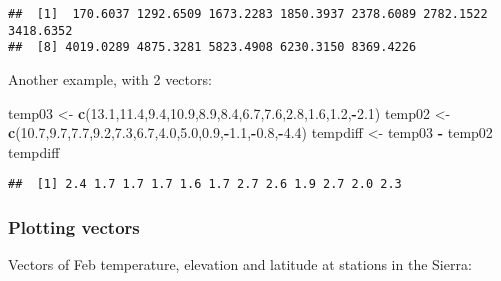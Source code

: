 \documentclass[
]{book}
\newenvironment{Shaded}{\begin{snugshade}}{\end{snugshade}}
\newcommand{\FloatTok}[1]{\textcolor[rgb]{0.00,0.00,0.81}{#1}}
\newcommand{\KeywordTok}[1]{\textcolor[rgb]{0.13,0.29,0.53}{\textbf{#1}}}
\newcommand{\NormalTok}[1]{#1}
\newcommand{\OperatorTok}[1]{\textcolor[rgb]{0.81,0.36,0.00}{\textbf{#1}}}
\newcommand{\StringTok}[1]{\textcolor[rgb]{0.31,0.60,0.02}{#1}}
\begin{document}
\begin{verbatim}
##  [1]  170.6037 1292.6509 1673.2283 1850.3937 2378.6089 2782.1522 3418.6352
##  [8] 4019.0289 4875.3281 5823.4908 6230.3150 8369.4226
\end{verbatim}

Another example, with 2 vectors:

\begin{Shaded}
\begin{Highlighting}[]
\NormalTok{temp03 <-}\StringTok{ }\KeywordTok{c}\NormalTok{(}\FloatTok{13.1}\NormalTok{,}\FloatTok{11.4}\NormalTok{,}\FloatTok{9.4}\NormalTok{,}\FloatTok{10.9}\NormalTok{,}\FloatTok{8.9}\NormalTok{,}\FloatTok{8.4}\NormalTok{,}\FloatTok{6.7}\NormalTok{,}\FloatTok{7.6}\NormalTok{,}\FloatTok{2.8}\NormalTok{,}\FloatTok{1.6}\NormalTok{,}\FloatTok{1.2}\NormalTok{,}\OperatorTok{-}\FloatTok{2.1}\NormalTok{)}
\NormalTok{temp02 <-}\StringTok{ }\KeywordTok{c}\NormalTok{(}\FloatTok{10.7}\NormalTok{,}\FloatTok{9.7}\NormalTok{,}\FloatTok{7.7}\NormalTok{,}\FloatTok{9.2}\NormalTok{,}\FloatTok{7.3}\NormalTok{,}\FloatTok{6.7}\NormalTok{,}\FloatTok{4.0}\NormalTok{,}\FloatTok{5.0}\NormalTok{,}\FloatTok{0.9}\NormalTok{,}\OperatorTok{-}\FloatTok{1.1}\NormalTok{,}\OperatorTok{-}\FloatTok{0.8}\NormalTok{,}\OperatorTok{-}\FloatTok{4.4}\NormalTok{)}
\NormalTok{tempdiff <-}\StringTok{ }\NormalTok{temp03 }\OperatorTok{-}\StringTok{ }\NormalTok{temp02}
\NormalTok{tempdiff}
\end{Highlighting}
\end{Shaded}

\begin{verbatim}
##  [1] 2.4 1.7 1.7 1.7 1.6 1.7 2.7 2.6 1.9 2.7 2.0 2.3
\end{verbatim}

\hypertarget{plotting-vectors}{%
\subsubsection{Plotting vectors}\label{plotting-vectors}}

Vectors of Feb temperature, elevation and latitude at stations in the Sierra:
\end{document}
